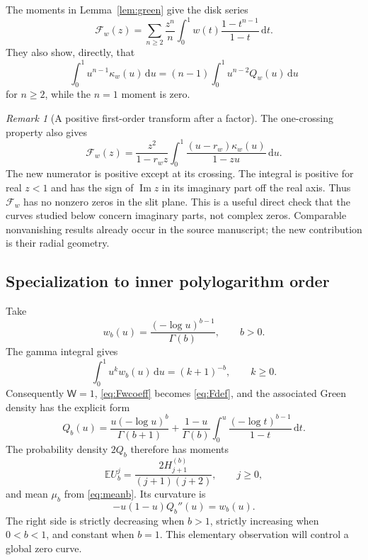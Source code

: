 \documentclass[11pt]{article}
\numberwithin{equation}{section}
\theoremstyle{definition}
\theoremstyle{remark}
\newtheorem{remark}[theorem]{Remark}
\DeclareMathOperator{\Imn}{Im}
\newcommand{\dd}{\,\mathrm d}
\newcommand{\E}{\mathbb E}
\newcommand{\Qw}{Q_w}
\newcommand{\Wtot}{\mathsf W}
\begin{document}
The moments in Lemma~\ref{lem:green} give the disk series
\begin{equation}\label{eq:Fwcoeff}
 \mathcal F_w(z)=\sum_{n\ge2}\frac{z^n}{n}
    \int_0^1w(t)\frac{1-t^{n-1}}{1-t}\dd t.
\end{equation}
They also show, directly, that
\[
 \int_0^1u^{n-1}\kappa_w(u)\dd u
       =(n-1)\int_0^1u^{n-2}\Qw(u)\dd u
\]
for $n\ge2$, while the $n=1$ moment is zero.

\begin{remark}[A positive first-order transform after a factor]
The one-crossing property also gives
\begin{equation}\label{eq:nonvanishing}
 \mathcal F_w(z)=\frac{z^2}{1-r_wz}
  \int_0^1\frac{(u-r_w)\kappa_w(u)}{1-zu}\dd u.
\end{equation}
The new numerator is positive except at its crossing. The integral is
positive for real $z<1$ and has the sign of $\Imn z$ in its imaginary
part off the real axis. Thus $\mathcal F_w$ has no nonzero zeros in
the slit plane. This is a useful direct check that the curves studied
below concern imaginary parts, not complex zeros. Comparable
nonvanishing results already occur in the source manuscript; the new
contribution is their radial geometry.
\end{remark}

\subsection{Specialization to inner polylogarithm order}
Take
\begin{equation}\label{eq:wb}
 w_b(u)=\frac{(-\log u)^{b-1}}{\Gamma(b)},\qquad b>0.
\end{equation}
The gamma integral gives
\[
 \int_0^1u^k w_b(u)\dd u=(k+1)^{-b},\qquad k\ge0.
\]
Consequently $\Wtot=1$, \eqref{eq:Fwcoeff} becomes \eqref{eq:Fdef},
and the associated Green density has the explicit form
\begin{equation}\label{eq:Qb}
 Q_b(u)=\frac{u(-\log u)^b}{\Gamma(b+1)}
 +\frac{1-u}{\Gamma(b)}
       \int_0^u\frac{(-\log t)^{b-1}}{1-t}\dd t.
\end{equation}
The probability density $2Q_b$ therefore has moments
\begin{equation}\label{eq:rawb}
 \E U_b^j=\frac{2H_{j+1}^{(b)}}{(j+1)(j+2)},\qquad j\ge0,
\end{equation}
and mean $\mu_b$ from \eqref{eq:meanb}. Its curvature is
\begin{equation}\label{eq:Qbcurvature}
 -u(1-u)Q_b''(u)=w_b(u).
\end{equation}
The right side is strictly decreasing when $b>1$, strictly increasing
when $0<b<1$, and constant when $b=1$. This elementary observation
will control a global zero curve.
\end{document}
